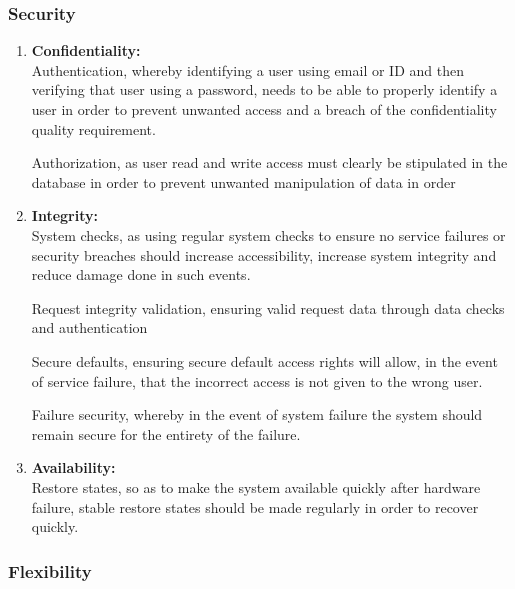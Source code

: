 \documentclass{article}
\begin{document}
		\subsubsection{Security}

			\begin{enumerate}

				\item{\bfseries Confidentiality:}\\

				Authentication, whereby identifying a user using email or ID and then verifying that user using a password, needs to be able to properly identify a user in order to prevent unwanted access and a breach of the confidentiality quality requirement.

				Authorization, as user read and write access must clearly be stipulated in the database in order to prevent unwanted manipulation of data in order

				\item{\bfseries Integrity:}\\

				System checks, as using regular system checks to ensure no service failures or security breaches should increase accessibility, increase system integrity and reduce damage done in such events.

				Request integrity validation, ensuring valid request data through data checks and authentication

				Secure defaults, ensuring secure default access rights will allow, in the event of service failure, that the incorrect access is not given to the wrong user.

				Failure security, whereby in the event of system failure the system should remain secure for the entirety of the failure.

				\item{\bfseries Availability:}\\

				Restore states, so as to make the system available quickly after hardware failure, stable restore states should be made regularly in order to recover quickly.\

			\end{enumerate}

		\subsubsection{Flexibility}
\end{document}
